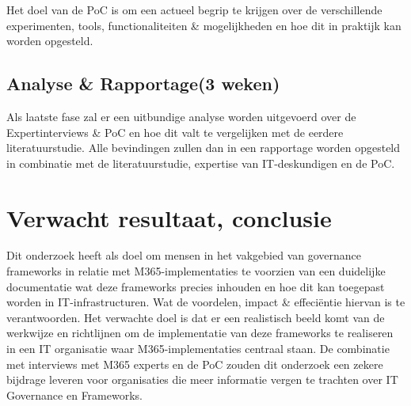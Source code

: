 Het doel van de PoC is om een actueel begrip te krijgen over de verschillende experimenten,  tools, functionaliteiten \& mogelijkheden  en hoe dit in praktijk kan worden opgesteld. 

\subsection{ Analyse \& Rapportage(3 weken)}
Als laatste fase zal er een uitbundige analyse worden uitgevoerd over de Expertinterviews \& PoC en hoe dit valt te vergelijken met de eerdere literatuurstudie. Alle bevindingen zullen dan in een rapportage worden opgesteld in combinatie met de literatuurstudie, expertise van IT-deskundigen en de PoC.


\section{Verwacht resultaat, conclusie}%
\label{sec:verwachte_resultaten}

Dit onderzoek heeft als doel om mensen in het vakgebied van governance frameworks in relatie met M365-implementaties te voorzien van een duidelijke documentatie wat deze frameworks precies inhouden en hoe dit kan toegepast worden in IT-infrastructuren. Wat de voordelen, impact \& effeciëntie hiervan is te verantwoorden. Het verwachte doel is dat er een realistisch beeld komt van de werkwijze en richtlijnen om de implementatie van deze frameworks te realiseren in een IT organisatie waar M365-implementaties centraal staan.
De combinatie met interviews met M365 experts en de PoC zouden dit onderzoek een zekere bijdrage leveren voor organisaties die meer informatie vergen te trachten over IT Governance en Frameworks.



